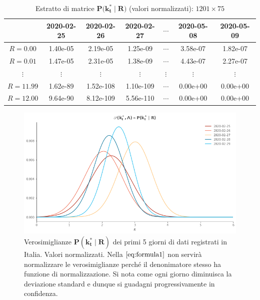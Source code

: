 \documentclass[11pt]{article}
\begin{document}
    
\begin{table}
  \begin{center}
    \caption{Estratto di matrice $\mathbf{P\big( k_t^* \;\big|\; R \big)}$ (valori normalizzati): $1201 \times 75$}
    \label{tab:likelihoods}
    \begin{tabular}{c|c|c|c|c|c|c|}
          & 2020-02-25 & 
          2020-02-26 &
          2020-02-27 &
          $\cdots$ & 
          2020-05-08 & 
          2020-05-09 \\
        \toprule
        $R=0.00$ & 1.40e-05 & 2.19e-05 & 1.25e-09 & $\cdots$ & 3.58e-07 & 1.82e-07 \\
        \midrule
        $R=0.01$ & 1.47e-05 & 2.31e-05 & 1.38e-09 & $\cdots$ & 4.43e-07 & 2.27e-07 \\
        \midrule
        $\vdots$ & $\vdots$ & $\vdots$ & $\vdots$ & $\vdots$ & $\vdots$ & $\vdots$ \\
        \midrule
        $R=11.99$ & 1.62e-89 & 1.52e-108 & 1.10e-109 & $\cdots$ & 0.00e+00 & 0.00e+00 \\
        \midrule
        $R=12.00$ & 9.64e-90 & 8.12e-109 & 5.56e-110 & $\cdots$ & 0.00e+00 & 0.00e+00 \\
        \bottomrule
    \end{tabular}
  \end{center}
\end{table}
        

    
    
    \begin{figure}
    \centering
        \includegraphics{likelihoods.png}
        \caption{Verosimiglianze $\mathbf{P( k_t^* \;|\; R )}$ dei primi 5 giorni di dati registrati in Italia. Valori normalizzati. Nella $\eqref{eq:formula1}$ non servirà normalizzare le verosimiglianze perché il denonimatore stesso ha funzione di normalizzazione. Si nota come ogni giorno diminuisca la deviazione standard e dunque si guadagni progressivamente in confidenza.}
        \label{fig:likelihoods}
    \end{figure}
\end{document}
